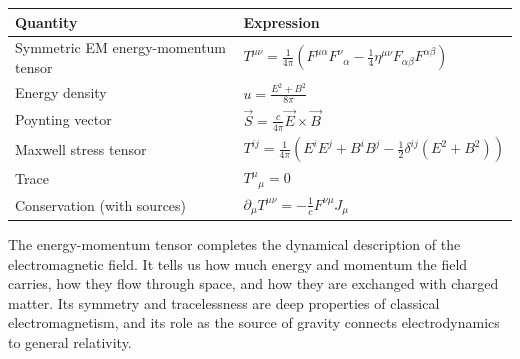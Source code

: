 \begin{table}[h]
\centering
\renewcommand{\arraystretch}{1.5}
\begin{tabular}{ll}
\toprule
\textbf{Quantity} & \textbf{Expression} \\
\midrule
Symmetric EM energy-momentum tensor & $T^{\mu\nu} = \frac{1}{4\pi}\!\left(F^{\mu\alpha}F^{\nu}{}_\alpha - \frac{1}{4}\eta^{\mu\nu}F_{\alpha\beta}F^{\alpha\beta}\right)$ \\
Energy density & $u = \frac{E^2 + B^2}{8\pi}$ \\
Poynting vector & $\vec{S} = \frac{c}{4\pi}\vec{E}\times\vec{B}$ \\
Maxwell stress tensor & $T^{ij} = \frac{1}{4\pi}\!\left(E^iE^j + B^iB^j - \frac{1}{2}\delta^{ij}(E^2+B^2)\right)$ \\
Trace & $T^\mu{}_\mu = 0$ \\
Conservation (with sources) & $\partial_\mu T^{\mu\nu} = -\frac{1}{c}F^{\nu\mu}J_\mu$ \\
\bottomrule
\end{tabular}
\end{table}

The energy-momentum tensor completes the dynamical description of the electromagnetic field. It tells us how much energy and momentum the field carries, how they flow through space, and how they are exchanged with charged matter. Its symmetry and tracelessness are deep properties of classical electromagnetism, and its role as the source of gravity connects electrodynamics to general relativity.
